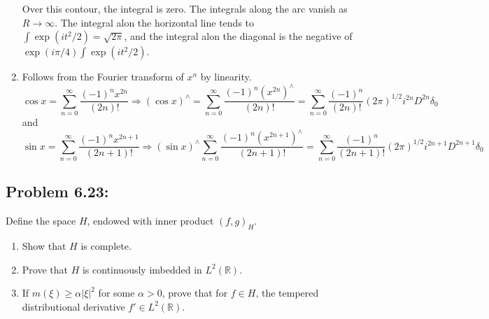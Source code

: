 \documentclass[letterpaper,twoside,11pt]{article}
\theoremstyle{mystyle}
\newcommand{\R}{{\mathbb R}}
\newcommand{\cbk}{\color{black}}
\begin{document}
\begin{enumerate}
\begin{center}
    \end{center}
    Over this contour, the integral is zero. The integrals along the arc vanish as $R \to \infty$. The integral alon the horizontal line tends to $\int \exp(it^2/2) = \sqrt{2\pi}$, and the integral alon the diagonal is the negative of $\exp(i\pi/4)\int\exp(it^2/2)$.
  \item Follows from the Fourier transform of $x^n$ by linearity. 
  \[\cos x = \sum\limits_{n = 0}^\infty  {\frac{{{{\left( { - 1} \right)}^n}{x^{2n}}}}{{\left( {2n} \right)!}}}  \Rightarrow {\left( {\cos x} \right)^ \wedge } = \sum\limits_{n = 0}^\infty  {\frac{{{{\left( { - 1} \right)}^n}{{\left( {{x^{2n}}} \right)}^ \wedge }}}{{\left( {2n} \right)!}}}  = \sum\limits_{n = 0}^\infty  {\frac{{{{\left( { - 1} \right)}^n}}}{{\left( {2n} \right)!}}{{\left( {2\pi } \right)}^{1/2}}{i^{2n}}{D^{2n}}{\delta _0}} \]
  and
  \[\sin x = \sum\limits_{n = 0}^\infty  {\frac{{{{\left( { - 1} \right)}^n}{x^{2n + 1}}}}{{\left( {2n + 1} \right)!}}}  \Rightarrow {\left( {\sin x} \right)^ \wedge }\sum\limits_{n = 0}^\infty  {\frac{{{{\left( { - 1} \right)}^n}{{\left( {{x^{2n + 1}}} \right)}^ \wedge }}}{{\left( {2n + 1} \right)!}}}  = \sum\limits_{n = 0}^\infty  {\frac{{{{\left( { - 1} \right)}^n}}}{{\left( {2n + 1} \right)!}}{{\left( {2\pi } \right)}^{1/2}}{i^{2n + 1}}{D^{2n + 1}}{\delta _0}} \]
\end{enumerate}

























\cbk 
\subsection*{Problem 6.23:}
Define the space $H$, endowed with inner product $\left( f,g \right)_H$. 
\begin{enumerate}
  \item Show that $H$ is complete. 
  \item Prove that $H$ is continuously imbedded in $L^2 \left( \R \right)$. 
  \item If $m(\xi) \geq \alpha |\xi|^2$ for some $\alpha >0$, prove that for $f \in H$, the tempered distributional derivative $f'\in L^2(\R)$. 
\end{enumerate}
\end{document}
